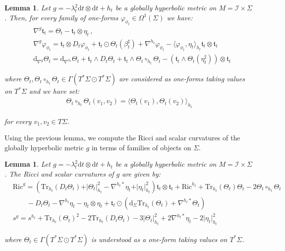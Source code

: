 \documentclass[10pt,reqno,a4paper]{amsart}
\theoremstyle{plain}
\newtheorem{lemma}[thm]{Lemma}
\theoremstyle{definition}
\theoremstyle{remark}
\theoremstyle{remark}
\def\dd{\mathrm{d}}
\newcommand{\Tr}{\mathrm{Tr}}
\def\cI{\mathcal{I}}
\newcommand{\Ric}{\mathrm{Ric}}
\renewcommand{\(}{ (}
\renewcommand{\)}{ )}
\begin{document}
\begin{lemma}
\label{lemma:hyperbolicderivatives}
Let $g = - \lambda_t^2 \dd t \otimes \dd t + h_t$ be a globally hyperbolic metric on $M = \cI\times \Sigma$. Then, for every family of one-forms $\varphi_{\phi_t} \in \Omega^1(\Sigma)$ we have:
\begin{eqnarray*}
& \nabla^g \mathfrak{t}_t = \Theta_t-\mathfrak{t}_t\otimes\eta_t\, , \\
& \nabla^g\varphi_{\phi_t} = \mathfrak{t}_t\otimes D_t\varphi_{\phi_t} + \mathfrak{t}_t\odot \Theta_t (\beta^{\sharp}_t) + \nabla^{h_t}\varphi_{\phi_t} - \langle\varphi_{\phi_t},\eta_t\rangle_{h_t}\mathfrak{t}_t\otimes\mathfrak{t}_t\\
& \dd_{\nabla^g} \Theta_t = \dd_{\nabla^{h_t}} \Theta_t + \mathfrak{t}_t\wedge D_t\Theta_t + \mathfrak{t}_t\wedge \Theta_t\circ_{h_t} \Theta_t - (\mathfrak{t}_t\wedge\Theta_t(\eta_t^{\sharp}))\otimes\mathfrak{t}_t 
\end{eqnarray*}

\noindent
where $\Theta_t , \Theta_t\circ_{h_t}\Theta_t \in \Gamma(T^{\ast}\Sigma \odot T^{\ast}\Sigma)$ are considered as one-forms taking values on $T^{\ast}\Sigma$ and we have set:
\begin{eqnarray*}
\Theta_t\circ_{h_t}\Theta_t (v_1,v_2) = \langle \Theta_t(v_1) , \Theta_t(v_2)\rangle_{h_t}
\end{eqnarray*} 

\noindent
for every $v_1,v_2 \in T\Sigma$.
\end{lemma}

\noindent
Using the previous lemma, we compute the Ricci and scalar curvatures of the globally hyperbolic metric $g$ in terms of families of objects on $\Sigma$.
\begin{lemma}
\label{lemma:hyperboliccurvatures}
Let $g = - \lambda_t^2 \dd t \otimes \dd t + h_t$ be a globally hyperbolic metric on $M = \cI\times \Sigma$. The Ricci and scalar curvatures of $g$ are given by:
\begin{eqnarray*}
& \Ric^g = (\Tr_{h_t}(D_t\Theta_t) + \vert \Theta_t \vert_{h_t}^2 - \nabla^{h_t\ast}\eta_t + \vert\eta_t\vert_{h_t}^2)\mathfrak{t}_t\otimes\mathfrak{t}_t + \Ric^{h_t} + \Tr_{h_t}(\Theta_t) \Theta_t - 2 \Theta_t\circ_{h_t} \Theta_t\\
& \qquad - D_t\Theta_t - \nabla^{h_t}\eta_t-\eta_t\otimes\eta_t + \mathfrak{t}_t \odot (\dd_{\Sigma} \Tr_{h_t}(\Theta_t) + \nabla^{h_t\ast}\Theta_t)\\
& s^g = s^{h_t} + \Tr_{h_t}(\Theta_t)^2 - 2 \Tr_{h_t}(D_t\Theta_t) - 3 \vert \Theta_t\vert_{h_t}^2 + 2\nabla^{h_t\ast}\eta_t-2\vert\eta_t\vert_{h_t}^2 
\end{eqnarray*}

\noindent
where $\Theta_t\in \Gamma(T^{\ast}\Sigma\odot T^{\ast}\Sigma)$ is understood as a one-form taking values on $T^{\ast}\Sigma$.
\end{lemma}  
\end{document}
